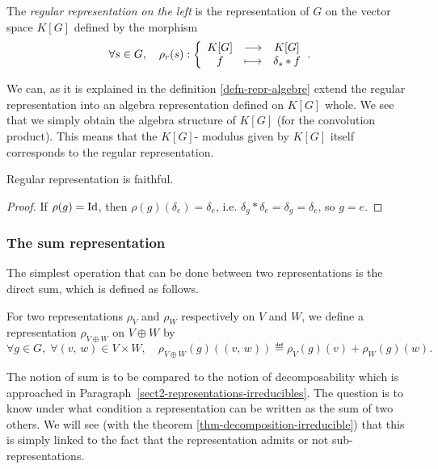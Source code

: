 \begin{defn}
The \textit{regular representation on the left} is the representation of $G$ on the vector space $ K[G] $ defined by the morphism
\begin{equation*}
\forall s \in G, \quad \rho_r (s): {\left\{ \begin{array}{ccc} K[G] & \longrightarrow & K[G] \\ f & \longmapsto & \delta_s * f \end{array} \right.}.
\end{equation*}
\end{defn}
 
 
\begin{rem}
We can, as it is explained in the definition \ref{defn-repr-algebre} extend the regular representation into an algebra representation defined on $ K[G] $ whole. We see that we simply obtain the algebra structure of $ K[G] $ (for the convolution product). This means that the $ K[G]$- modulus given by $ K[G] $ itself corresponds to the regular representation.
\end{rem}
 
 
\begin{prop}
\label{prop-repr-regular-fidele}
Regular representation is faithful.
\end{prop}
\begin{proof}
If $ \rho (g) = \operatorname{Id} $, then $ \rho (g) (\delta_e) = \delta_e $, i.e. $ \delta_g * \delta_e = \delta_g = \delta_e $, so $ g = e $.
\end{proof}
 
\subsubsection{The sum representation}
\label{sect3-representation-sum}
 
  The simplest operation that can be done between two representations is the direct sum, which is defined as follows.
 
\begin{defn}
\label{notation-73} \label{notation-74} For two representations $ \rho_V $ and $ \rho_W $ respectively on $V$ and $ W $, we define a representation $ \rho_{V \oplus W} $ on $ V \oplus W $ by
\begin{equation*}
\forall g \in G, \; \forall (v, \, w) \in V \times W, \quad \rho_{V \oplus W} (g) ((v, \, w)) \eqdef \rho_V (g) (v) + \rho_W (g) (w).
\end{equation*}
\end{defn}
The notion of sum is to be compared to the notion of decomposability which is approached in Paragraph~\ref{sect2-representations-irreducibles}. The question is to know under what condition a representation can be written as the sum of two others. We will see (with the theorem \ref{thm-decomposition-irreducible}) that this is simply linked to the fact that the representation admits or not sub-representations.
 
